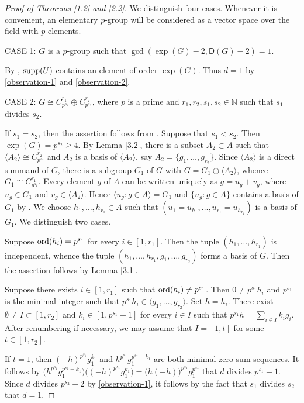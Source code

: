 \documentclass[a4paper,10pt]{amsart}
\theoremstyle{plain}
\theoremstyle{definition}
\newcommand{\N}{\mathbb N}
\numberwithin{equation}{section}
\begin{document}
\begin{proof}[Proof of Theorems \ref{1.2} and \ref{2.2}]
We distinguish four cases. Whenever it is convenient, an elementary $p$-group will be considered as a vector space over the field with $p$ elements.

\smallskip
\noindent
CASE 1: $G$ is a  $p$-group such that $\gcd ( \exp (G)-2, \mathsf D (G)-2)=1$.

  By \cite[Corollary 5.1.13]{Ge-HK06a}, $\operatorname{supp} (U)$ contains an element of order $\exp (G)$. Thus $d=1$ by  \eqref{observation-1} and \eqref{observation-2}.


\medskip
\noindent
CASE 2:  $G\cong C_{p^{s_1}}^{r_1}\oplus C_{p^{s_2}}^{r_2}$, where $p$ is a  prime and $r_1,r_2, s_1,s_2\in \N$ such that $s_1$ divides $s_2$.

If $s_1=s_2$, then the assertion follows from \cite[Theorem 3.11]{Ge-Zh18a}. Suppose that $s_1<s_2$. Then $\exp(G)=p^{s_2}\ge 4$.
By Lemma \ref{3.2}, there is a subset $A_2 \subset A$ such that $\langle A_2 \rangle \cong C_{p^{s_2}}^{r_2}$ and $A_2$ is a basis of $\langle A_2 \rangle$, say $A_2 = \{ g_1, \ldots, g_{r_2} \}$. Since $\langle A_2 \rangle$ is a direct summand of $G$, there is a subgroup
$G_1$  of $G$   with $G= G_1 \oplus \langle A_2\rangle$, whence $G_1\cong C_{p^{s_1}}^{r_1}$. Every element $g$ of $A$ can be written uniquely as $g=u_g+v_g$, where $u_g\in G_1$ and $v_g\in \langle A_2 \rangle$. Hence $\langle u_g\colon g\in A\rangle=G_1$ and $\{u_g\colon  g\in A\}$ contains a basis of $G_1$ by \cite[Lemma A.7.3]{Ge-HK06a}. We choose $h_1, \ldots, h_{r_1}\in A$ such that $(u_1=u_{h_1}, \ldots, u_{r_1}=u_{h_{r_1}})$ is a basis of $G_1$.
We distinguish two cases.


Suppose $\operatorname{ord}(h_i)=p^{s_1}$ for every $i\in [1, r_1]$.  Then the tuple $(h_1, \ldots, h_{r_1})$ is independent, whence the tuple $(h_1, \ldots, h_{r_1}, g_1, \ldots, g_{r_2})$ forms a basis of $G$. Then the assertion follows by Lemma \ref{3.1}.



Suppose there exists $i\in [1,r_1]$ such that $\operatorname{ord}(h_i)\neq p^{s_1}$. Then $0\neq p^{s_1}h_i$ and $p^{s_1}$ is the minimal integer such that $p^{s_1}h_i\in \langle g_1,\ldots, g_{r_2}\rangle$. Set $h=h_i$.
There exist  $\emptyset \ne I\subset [1,r_2]$ and $k_i\in [1, p^{s_1}-1]$ for every $i\in I$ such that $p^{s_1}h=\sum_{i\in I}k_ig_i$. After renumbering if necessary, we may assume that $I=[1,t]$ for some $t \in [1, r_2]$.

 If $t=1$, then $(-h)^{p^{s_1}}g_1^{k_1}$ and $h^{p^{s_1}}g_1^{p^{s_2}-k_1}$ are both minimal zero-sum sequences. It follows by $\big( h^{p^{s_1}}g_1^{p^{s_2}-k_1} \big) \big((-h)^{p^{s_1}}g_1^{k_1} \big)= \big(h(-h) \big)^{p^{s_1}}g_1^{p^{s_2}}$ that $d$ divides $p^{s_1}-1$. Since $d$ divides $p^{s_2}-2$ by \eqref{observation-1}, it follows by the fact that  $s_1$ divides $s_2$ that $d=1$.


\end{proof}
\end{document}
